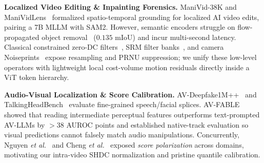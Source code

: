 \documentclass[10pt,twocolumn]{article}
\begin{document}
\noindent\textbf{Localized Video Editing \& Inpainting Forensics.} ManiVid-38K and ManiVidLens~\cite{kang2026manividlens} formalized spatio-temporal grounding for localized AI video edits, pairing a 7B MLLM with SAM2. However, semantic encoders struggle on flow-propagated object removal~\cite{zhou2023propainter,bian2025videopainter,li2025diffuerasor} ($0.135$ mIoU) and incur multi-second latency. Classical constrained zero-DC filters~\cite{bayar2018constrained}, SRM filter banks~\cite{fridrich2012rich}, and camera Noiseprints~\cite{cozzolino2019noiseprint} expose resampling and PRNU suppression; we unify these low-level operators with lightweight local cost-volume motion residuals directly inside a ViT token hierarchy.

\noindent\textbf{Audio-Visual Localization \& Score Calibration.} AV-Deepfake1M++~\cite{cai2024avdeepfake1m,cai2025avdeepfake1mpp} and TalkingHeadBench~\cite{xiong2025talkingheadbench} evaluate fine-grained speech/facial splices. AV-FABLE~\cite{huang2026avfable} showed that reading intermediate perceptual features outperforms text-prompted AV-LLMs by $>38$ AUROC points and established native-track evaluation so visual predictions cannot falsely match audio manipulations. Concurrently, Nguyen \emph{et al.}~\cite{nguyen2026whenaucmisleads} and Cheng \emph{et al.}~\cite{cheng2026midffd} exposed \emph{score polarization} across domains, motivating our intra-video SHDC normalization and pristine quantile calibration.

\begin{table}[t]
\centering
\caption{\textbf{Coverage across modern AI video manipulation families} and corresponding HoST-MoE forensic mechanisms.}
\label{tab:taxonomy}
\vspace{-6pt}
\end{table}
\end{document}
